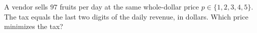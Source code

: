 A vendor sells $97$ fruits per day at the same whole-dollar price $p\in\{1,2,3,4,5\}$. The tax equals the last two digits of the daily revenue, in dollars. Which price minimizes the tax?
